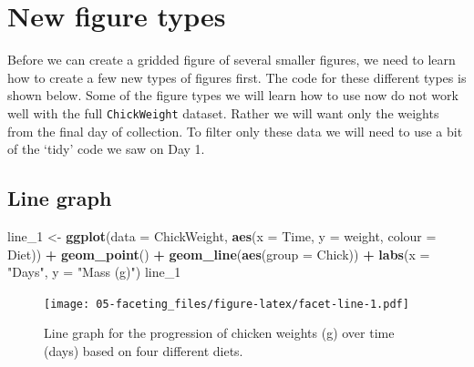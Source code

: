 \documentclass[]{book}
\newenvironment{Shaded}{\begin{snugshade}}{\end{snugshade}}
\newcommand{\KeywordTok}[1]{\textcolor[rgb]{0.13,0.29,0.53}{\textbf{#1}}}
\newcommand{\DataTypeTok}[1]{\textcolor[rgb]{0.13,0.29,0.53}{#1}}
\newcommand{\DecValTok}[1]{\textcolor[rgb]{0.00,0.00,0.81}{#1}}
\newcommand{\StringTok}[1]{\textcolor[rgb]{0.31,0.60,0.02}{#1}}
\newcommand{\OperatorTok}[1]{\textcolor[rgb]{0.81,0.36,0.00}{\textbf{#1}}}
\newcommand{\NormalTok}[1]{#1}
\theoremstyle{definition}
\theoremstyle{definition}
\theoremstyle{definition}
\theoremstyle{remark}
\begin{document}
\section{New figure types}\label{new-figure-types}

Before we can create a gridded figure of several smaller figures, we
need to learn how to create a few new types of figures first. The code
for these different types is shown below. Some of the figure types we
will learn how to use now do not work well with the full
\texttt{ChickWeight} dataset. Rather we will want only the weights from
the final day of collection. To filter only these data we will need to
use a bit of the `tidy' code we saw on Day 1.

\begin{Shaded}
\end{Shaded}

\subsection{Line graph}\label{line-graph}

\begin{Shaded}
\begin{Highlighting}[]
\NormalTok{line_}\DecValTok{1}\NormalTok{ <-}\StringTok{ }\KeywordTok{ggplot}\NormalTok{(}\DataTypeTok{data =}\NormalTok{ ChickWeight, }\KeywordTok{aes}\NormalTok{(}\DataTypeTok{x =}\NormalTok{ Time, }\DataTypeTok{y =}\NormalTok{ weight, }\DataTypeTok{colour =}\NormalTok{ Diet)) }\OperatorTok{+}
\StringTok{  }\KeywordTok{geom_point}\NormalTok{() }\OperatorTok{+}
\StringTok{  }\KeywordTok{geom_line}\NormalTok{(}\KeywordTok{aes}\NormalTok{(}\DataTypeTok{group =}\NormalTok{ Chick)) }\OperatorTok{+}
\StringTok{  }\KeywordTok{labs}\NormalTok{(}\DataTypeTok{x =} \StringTok{"Days"}\NormalTok{, }\DataTypeTok{y =} \StringTok{"Mass (g)"}\NormalTok{)}
\NormalTok{line_}\DecValTok{1}
\end{Highlighting}
\end{Shaded}

\begin{figure}
\centering
\texttt{[image: 05-faceting\_files/figure-latex/facet-line-1.pdf]}
\caption{\label{fig:facet-line}Line graph for the progression of chicken
weights (g) over time (days) based on four different diets.}
\end{figure}
\end{document}

